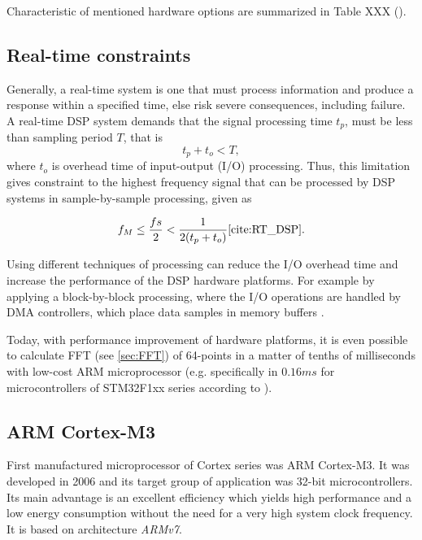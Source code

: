 \documentclass[twoside]{ctuthesis}
\theoremstyle{plain}
\theoremstyle{definition}
\theoremstyle{note}
\begin{document}
Characteristic of mentioned hardware options are summarized in Table XXX (\cite{cite:RT_DSP}).

\subsection{Real-time constraints}
\label{R-T constrains}
Generally, a real-time system is one that must process information and produce a response within a specified time, else risk severe consequences, including failure. A real-time DSP system demands that the signal processing time $t_{p}$, must be less than sampling period $T$, that is
\begin{equation} \label{eq:hardRealTime1}
t_{p}+t_{o}<T,
\end{equation}
where $t_{o}$ is overhead time of input-output (I/O) processing.
Thus, this limitation gives constraint to the highest frequency signal that can be processed by DSP systems in sample-by-sample processing, given as

\begin{equation} \label{eq:hardRealTime2}
f_{M} \leq \frac{fs}{2} < \frac{1}{2(t_{p}+t_{o})} \cite{cite:RT_DSP}.
\end{equation}

Using different techniques of processing can reduce the I/O overhead time and increase the performance of the DSP hardware platforms. For example by applying a block-by-block processing, where the I/O operations are handled by DMA controllers, which place data samples in memory buffers \cite{cite:RT_DSP}.

Today, with performance improvement of hardware platforms, it is even possible to calculate FFT (see \ref{sec:FFT}) of 64-points in a matter of tenths of milliseconds with low-cost ARM microprocessor (e.g. specifically in $0.16 ms$ for microcontrollers of STM32F1xx series according to \cite{cite:STM32_DSP_library}).
\subsection{ARM Cortex-M3}
\label{sec:ARM_M3}
First manufactured microprocessor of Cortex series was ARM Cortex-M3. It was developed in 2006 and its target group of application was 32-bit microcontrollers. Its main advantage is an excellent efficiency which yields high performance and a low energy consumption without the need for a very high system clock frequency. It is based on architecture \textit{ARMv7}.
\end{document}
